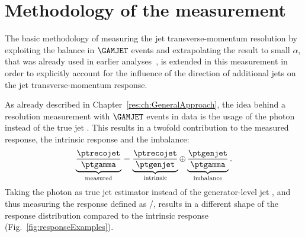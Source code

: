 \chapter{Methodology of the measurement}
\label{res:ch:methodology}

The basic methodology of measuring the jet transverse-momentum resolution by exploiting the \pt balance in $\GAMJET$ events and extrapolating the result to small $\alpha$, that was already used in earlier analyses~\cite{bib:CMS:JERCPaper_2011,CMS:PAS:JETResolution_7TeV}, is extended in this measurement in order to explicitly account for the influence of the direction of additional jets on the jet transverse-momentum response.

As already described in Chapter~\ref{res:ch:GeneralApproach}, the idea behind a resolution measurement with $\GAMJET$ events in data is the usage of the photon \pt instead of the true jet \pt.
This results in a twofold contribution to the measured response, the intrinsic response and the imbalance:
\begin{equation}\label{eq:splittedResolution}
\underbrace{\frac{\ptrecojet}{\ptgamma}}_{\text{measured}} = \underbrace{\frac{\ptrecojet}{\ptgenjet}}_{\text{intrinsic}} \oplus \underbrace{\frac{\ptgenjet}{\ptgamma}}_{\text{imbalance}}.
\end{equation}
Taking the photon \pt as true jet \pt estimator instead of the generator-level jet \pt, and thus measuring the response defined as \ptrecojet/\ptgamma, results in a different shape of the response distribution compared to the intrinsic response (Fig.~\ref{fig:responseExamples}). 
